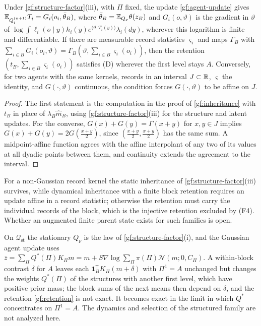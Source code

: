 Under \cref{gf:structure-factor}(iii), with $\Pi$ fixed, the update
\cref{gf:agent-update} gives $\mathbb E_{Q_i^{(n+1)}}T_i=G_i(o_i,\bar\theta_B)$, where
$\bar\theta_B=\mathbb E_{Q_\nu}\theta(z_B)$ and $G_i(o,\vartheta)$ is the gradient
in $\vartheta$ of $\log\int\ell_i(o\mid y)h_i(y)e^{\langle\vartheta,T_i(y)\rangle}
\lambda_i(dy)$, wherever this logarithm is finite and differentiable. If there are measurable record statistics
$\varsigma_i$ and maps $\Gamma_B$ with $\sum_{i\in B}G_i(o_i,\vartheta)=
\Gamma_B(\vartheta,\sum_{i\in B}\varsigma_i(o_i))$, then the retention
$(t_B,\sum_{i\in B}\varsigma_i(o_i))$ satisfies (D) wherever the first level
stays $A$. Conversely, for two agents with the same kernels, records in an
interval $J\subset\mathbb R$, $\varsigma$ the identity, and $G(\cdot,\vartheta)$
continuous, the condition forces $G(\cdot,\vartheta)$ to be affine on $J$.
\begin{proof}
The first statement is the computation in the proof of
\cref{gf:inheritance} with $t_B$ in place of $\lambda_B\hat m_B$, using
\cref{gf:structure-factor}(iii) for the structure and latent updates. For the
converse, $G(x)+G(y)=\Gamma(x+y)$ for $x,y\in J$ implies
$G(x)+G(y)=2G(\tfrac{x+y}2)$, since $(\tfrac{x+y}2,\tfrac{x+y}2)$ has the same
sum. A midpoint-affine function agrees with the affine interpolant of any
two of its values at all dyadic points between them, and continuity extends
the agreement to the interval.
\end{proof}

For a non-Gaussian record kernel the static inheritance of
\cref{gf:structure-factor}(iii) survives, while dynamical inheritance with a
finite block retention requires an update affine in a record statistic;
otherwise the retention must carry the individual records of the block,
which is the injective retention excluded by (F4). Whether an augmented
finite parent state exists for such families is open.

On $\mathcal Q_{\mathrm{st}}$ the stationary $Q_\nu$ is the law of
\cref{gf:structure-factor}(i), and the Gaussian agent update uses
$\bar z=\sum_\Pi Q^*(\Pi)K_\Pi m=m+S\nabla\log\sum_\Pi\pi(\Pi)\mathcal
N(m;0,C_\Pi)$. A within-block contrast $\delta$ for $A$ leaves each
$\mathbf 1_B^{\mathsf T}K_\Pi(m+\delta)$ with $\Pi^1=A$ unchanged but changes
the weights $Q^*(\Pi)$ of the structures with another first level, which
have positive prior mass; the block sums of the next means then depend on
$\delta$, and the retention \cref{gf:retention} is not exact. It becomes
exact in the limit in which $Q^*$ concentrates on $\Pi^1=A$. The dynamics and
selection of the structured family are not analyzed here.

